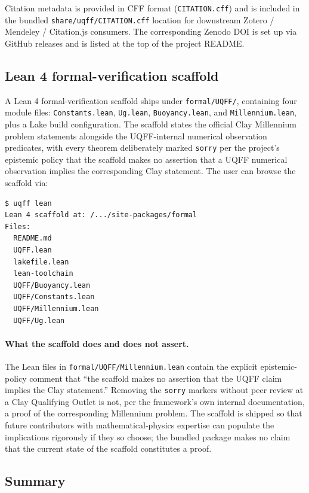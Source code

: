 Citation metadata is provided in CFF format (\texttt{CITATION.cff})
and is included in the bundled \texttt{share/uqff/CITATION.cff}
location for downstream Zotero / Mendeley / Citation.js consumers.
The corresponding Zenodo DOI is set up via GitHub releases and is
listed at the top of the project README.

\subsection{Lean 4 formal-verification scaffold}
\label{sec:lean_scaffold}

A Lean 4 \cite{deMoura2021} formal-verification scaffold ships under
\texttt{formal/UQFF/}, containing four module files:
\texttt{Constants.lean}, \texttt{Ug.lean}, \texttt{Buoyancy.lean}, and
\texttt{Millennium.lean}, plus a Lake build configuration. The scaffold
states the official Clay Millennium problem statements alongside the
UQFF-internal numerical observation predicates, with every theorem
deliberately marked \texttt{sorry} per the project's epistemic policy
that the scaffold makes no assertion that a UQFF numerical observation
implies the corresponding Clay statement. The user can browse the
scaffold via:

\begin{verbatim}
$ uqff lean
Lean 4 scaffold at: /.../site-packages/formal
Files:
  README.md
  UQFF.lean
  lakefile.lean
  lean-toolchain
  UQFF/Buoyancy.lean
  UQFF/Constants.lean
  UQFF/Millennium.lean
  UQFF/Ug.lean
\end{verbatim}

\paragraph{What the scaffold does and does not assert.}
The Lean files in \texttt{formal/UQFF/Millennium.lean} contain the
explicit epistemic-policy comment that ``the scaffold makes no
assertion that the UQFF claim implies the Clay statement.'' Removing
the \texttt{sorry} markers without peer review at a Clay Qualifying
Outlet is not, per the framework's own internal documentation, a
proof of the corresponding Millennium problem. The scaffold is
shipped so that future contributors with mathematical-physics
expertise can populate the implications rigorously if they so
choose; the bundled package makes no claim that the current state of
the scaffold constitutes a proof.

\subsection{Summary}
\label{sec:repro_summary}

